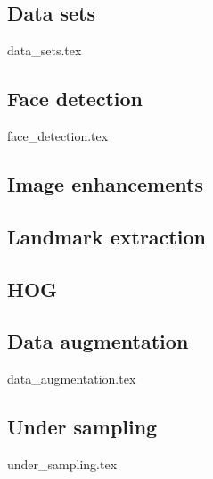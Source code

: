 \subsection{Data sets}
{data_sets.tex}
\subsection{Face detection}
{face_detection.tex}

\subsection{Image enhancements}


\subsection{Landmark extraction}


\subsection{HOG}


\subsection{Data augmentation}
{data_augmentation.tex}

\subsection{Under sampling}
{under_sampling.tex}